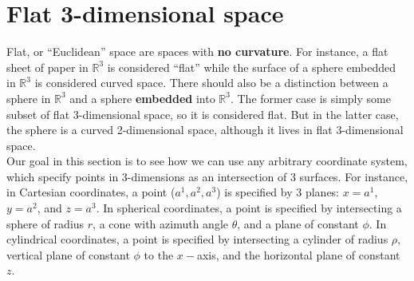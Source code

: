 \documentclass{book}
\theoremstyle{definition}
\begin{document}
\chapter{Flat 3-dimensional space}
Flat, or ``Euclidean'' space are spaces with \textbf{no curvature}. For instance, a flat sheet of paper in $\mathbb{R}^3$ is considered ``flat'' while the surface of a sphere embedded in $\mathbb{R}^3$ is considered curved space. There should also be a distinction between a sphere in $\mathbb{R}^3$ and a sphere \textbf{embedded} into $\mathbb{R}^3$. The former case is simply some subset of flat 3-dimensional space, so it is considered flat. But in the latter case, the sphere is a curved 2-dimensional space, although it lives in flat 3-dimensional space.\\

Our goal in this section is to see how  we can use any arbitrary coordinate system, which specify points in 3-dimensions as an intersection of 3 surfaces. For instance, in Cartesian coordinates, a point ($a^1,a^2,a^3$) is specified by 3 planes: $x = a^1$, $y=a^2$, and $z=a^3$. In spherical coordinates, a point is specified by intersecting a sphere of radius $r$, a cone with azimuth angle $\theta$, and a plane of constant $\phi$. In cylindrical coordinates, a point is specified by intersecting a cylinder of radius $\rho$, vertical plane of constant $\phi$ to the $x-$axis, and the horizontal plane of constant $z$.
\end{document}
